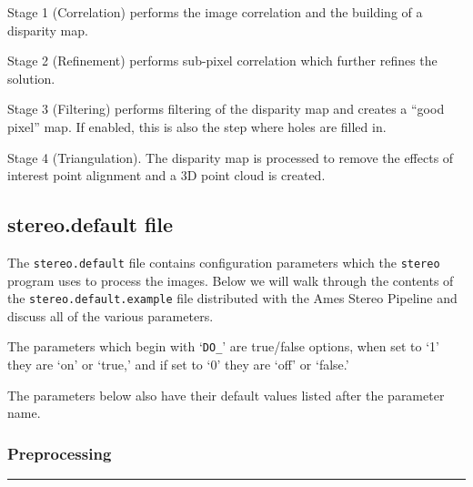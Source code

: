 Stage 1 (Correlation) performs the image correlation and the building
of a disparity map.

Stage 2 (Refinement) performs sub-pixel correlation which further
refines the solution.

Stage 3 (Filtering) performs filtering of the disparity map and
creates a ``good pixel'' map.  If enabled, this is also the step
where holes are filled in.

Stage 4 (Triangulation). The disparity map is processed to remove
the effects of interest point alignment and a 3D point cloud is
created.


\subsection{stereo.default file}
\label{stereo.default}

The \texttt{stereo.default} file contains configuration parameters
which the \texttt{stereo} program uses to process the images.  Below
we will walk through the contents of the \texttt{stereo.default.example}
file distributed with the Ames Stereo Pipeline and discuss all of
the various parameters.

The parameters which begin with `\texttt{DO\_}' are true/false options,
when set to `1' they are `on' or `true,' and if set to `0' they are
`off' or `false.'

The parameters below also have their default values listed after
the parameter name.

\subsubsection*{Preprocessing}
\hrule
\bigskip

